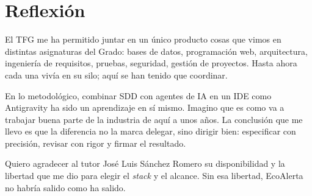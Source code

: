 \section{Reflexión}
\label{sec:reflexion}

El TFG me ha permitido juntar en un único producto cosas que vimos en distintas asignaturas del Grado: bases de datos, programación web, arquitectura, ingeniería de requisitos, pruebas, seguridad, gestión de proyectos. Hasta ahora cada una vivía en su silo; aquí se han tenido que coordinar.

En lo metodológico, combinar SDD con agentes de IA en un IDE como Antigravity ha sido un aprendizaje en sí mismo. Imagino que es como va a trabajar buena parte de la industria de aquí a unos años. La conclusión que me llevo es que la diferencia no la marca delegar, sino dirigir bien: especificar con precisión, revisar con rigor y firmar el resultado.

Quiero agradecer al tutor José Luis Sánchez Romero su disponibilidad y la libertad que me dio para elegir el \textit{stack} y el alcance. Sin esa libertad, EcoAlerta no habría salido como ha salido.

